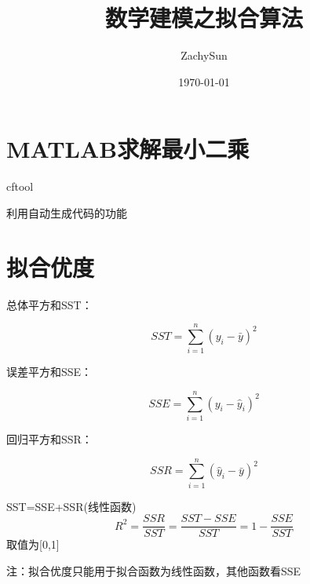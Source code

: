 \documentclass{article}
\title{数学建模之拟合算法}
\date{\today}
\author{ZachySun}
\begin{document}
\maketitle

\section{MATLAB求解最小二乘}

cftool

利用自动生成代码的功能

\section{拟合优度}
总体平方和SST：

$$
SST=\sum_{i=1}^n{\left( y_i-\bar{y} \right)}^2
$$


误差平方和SSE：

$$
SSE=\sum_{i=1}^n{\left( y_i-\hat{y}_i \right)}^2
$$


回归平方和SSR：

$$
SSR=\sum_{i=1}^n{\left( \hat{y}_i-\bar{y} \right)}^2
$$

SST=SSE+SSR(线性函数)
$$
R^2=\frac{SSR}{SST}=\frac{SST-SSE}{SST}=1-\frac{SSE}{SST}
$$
取值为[0,1]

注：拟合优度只能用于拟合函数为线性函数，其他函数看SSE
\end{document}

